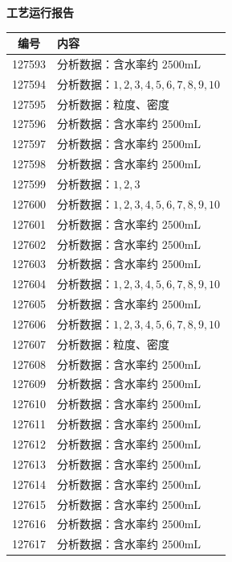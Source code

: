 \documentclass[UTF8,10pt,a4paper,fontset=fandol]{ctexart}
\begin{document}
\begin{center}
\begin{minipage}[t]{0.47\textwidth}
\centering
\textbf{工艺运行报告}

\smallskip
\begin{tabularx}{\linewidth}{|c|X|}
\hline
\textbf{编号} & \textbf{内容} \\ \hline
127593 & 分析数据：含水率约 $2500\mathrm{mL}$ \\ \hline
127594 & 分析数据：$1,2,3,4,5,6,7,8,9,10$ \\ \hline
127595 & 分析数据：粒度、密度 \\ \hline
127596 & 分析数据：含水率约 $2500\mathrm{mL}$ \\ \hline
127597 & 分析数据：含水率约 $2500\mathrm{mL}$ \\ \hline
127598 & 分析数据：含水率约 $2500\mathrm{mL}$ \\ \hline
127599 & 分析数据：$1,2,3$ \\ \hline
127600 & 分析数据：$1,2,3,4,5,6,7,8,9,10$ \\ \hline
127601 & 分析数据：含水率约 $2500\mathrm{mL}$ \\ \hline
127602 & 分析数据：含水率约 $2500\mathrm{mL}$ \\ \hline
127603 & 分析数据：含水率约 $2500\mathrm{mL}$ \\ \hline
127604 & 分析数据：$1,2,3,4,5,6,7,8,9,10$ \\ \hline
127605 & 分析数据：含水率约 $2500\mathrm{mL}$ \\ \hline
127606 & 分析数据：$1,2,3,4,5,6,7,8,9,10$ \\ \hline
127607 & 分析数据：粒度、密度 \\ \hline
127608 & 分析数据：含水率约 $2500\mathrm{mL}$ \\ \hline
127609 & 分析数据：含水率约 $2500\mathrm{mL}$ \\ \hline
127610 & 分析数据：含水率约 $2500\mathrm{mL}$ \\ \hline
127611 & 分析数据：含水率约 $2500\mathrm{mL}$ \\ \hline
127612 & 分析数据：含水率约 $2500\mathrm{mL}$ \\ \hline
127613 & 分析数据：含水率约 $2500\mathrm{mL}$ \\ \hline
127614 & 分析数据：含水率约 $2500\mathrm{mL}$ \\ \hline
127615 & 分析数据：含水率约 $2500\mathrm{mL}$ \\ \hline
127616 & 分析数据：含水率约 $2500\mathrm{mL}$ \\ \hline
127617 & 分析数据：含水率约 $2500\mathrm{mL}$ \\ \hline

\end{tabularx}
\end{minipage}
\end{center}
\end{document}
